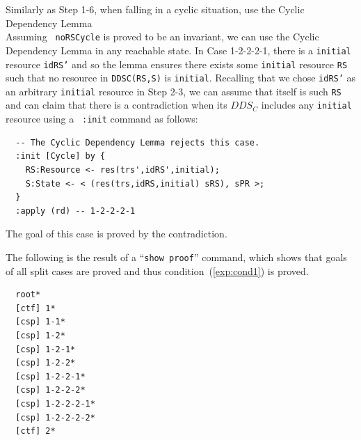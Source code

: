 \documentclass[12pt]{report}
\newcommand{\stt}[1]{{\small{\tt {#1}}}}
\begin{document}
 Similarly as Step 1-6, when falling in a
cyclic situation, use the Cyclic Dependency Lemma \\ Assuming {\tt
  noRSCycle} is proved to be an invariant, we can use the Cyclic
Dependency Lemma in any reachable state. In Case 1-2-2-2-1, there is a
{\tt initial} resource {\tt idRS'} and so the lemma ensures there
exists some {\tt initial} resource {\tt RS} such that no resource in
\stt{DDSC(RS,S)} is {\tt initial}. Recalling that we chose {\tt idRS'}
as an arbitrary {\tt initial} resource in Step 2-3, we can assume that
itself is such {\tt RS} and can claim that there is a contradiction
when its $DDS_C$ includes any {\tt initial} resource using a {\tt
  :init} command as follows:
\small
\begin{verbatim}
  -- The Cyclic Dependency Lemma rejects this case.
  :init [Cycle] by {
    RS:Resource <- res(trs',idRS',initial);
    S:State <- < (res(trs,idRS,initial) sRS), sPR >;
  }
  :apply (rd) -- 1-2-2-2-1
\end{verbatim}
\normalsize
The goal of this case is proved by the contradiction.

The following is the result of a ``\stt{show proof}'' command, which shows
that goals of all split cases are proved and thus
condition~(\ref{exp:cond1}) is proved.
\small
\begin{verbatim}
  root*
  [ctf] 1*
  [csp] 1-1*
  [csp] 1-2*
  [csp] 1-2-1*
  [csp] 1-2-2*
  [csp] 1-2-2-1*
  [csp] 1-2-2-2*
  [csp] 1-2-2-2-1*
  [csp] 1-2-2-2-2*
  [ctf] 2*
\end{verbatim}
\normalsize
\end{document}
